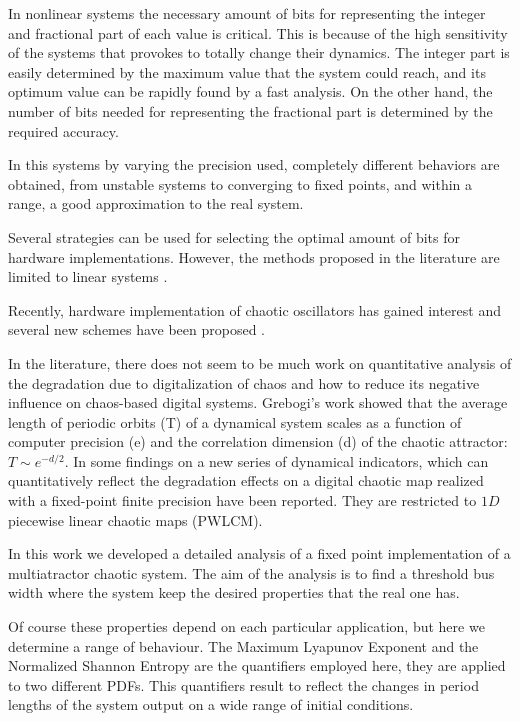 \documentclass[conference]{IEEEtran}
\begin{document}
In nonlinear systems the necessary amount of bits for representing
the integer and fractional part of each value is critical. This is
because of the high sensitivity of the systems that provokes to
totally change their dynamics. The integer part is easily
determined by the maximum value that the system could reach, and
its optimum value can be rapidly found by a fast analysis. On the
other hand, the number of bits needed for representing the
fractional part is determined by the required accuracy.

In this systems by varying the precision used, completely
different behaviors are obtained, from unstable systems to
converging to fixed points, and within a range, a good
approximation to the real system.

Several strategies can be used for selecting the optimal amount of
bits for hardware implementations. However, the methods proposed
in the literature are limited to linear systems
\cite{Constantinides2002,Constantinides2003}.

Recently, hardware implementation of chaotic oscillators has
gained interest and several new schemes have been proposed
\cite{Qun2007,Aseeri2002,Azzaz2009}.

In the literature, there does not seem to be much work on
quantitative analysis of the degradation due to digitalization of chaos and
how to reduce its negative influence on chaos-based digital
systems. Grebogi's work \cite{Grebogi1988} showed that the average
length of periodic orbits (T) of a dynamical system scales as a
function of computer precision (e) and the correlation dimension
(d) of the chaotic attractor: $T \sim  e^{-d/2}$. In
\cite{SHUJUN2005} some findings on a new series of dynamical
indicators, which can quantitatively reflect the degradation
effects on a digital chaotic map realized with a fixed-point
finite precision have been reported. They are restricted to $1D$
piecewise linear chaotic maps (PWLCM).

In this work we developed a detailed analysis of a fixed point implementation
of a multiatractor chaotic system. The aim of the analysis is to find a threshold
bus width where the system keep the desired properties that the real one has.

Of course these properties depend on each particular application,
but here we determine a range of behaviour. The Maximum Lyapunov
Exponent and the Normalized Shannon Entropy are the quantifiers
employed here, they are applied to two different PDFs. This
quantifiers result to reflect the changes in period lengths of the
system output on a wide range of initial conditions.
\end{document}
